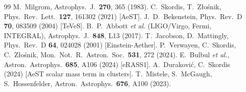 \documentclass[aps,prd,twocolumn,10pt,nofootinbib,superscriptaddress]{revtex4-2}
\begin{document}
\begin{thebibliography}{99}
 M.~Milgrom, Astrophys.\ J.\ \textbf{270}, 365 (1983).
 C.~Skordis, T.~Z\l o\'snik, Phys.\ Rev.\ Lett.\ \textbf{127}, 161302 (2021) [AeST].
 J.~D.~Bekenstein, Phys.\ Rev.\ D \textbf{70}, 083509 (2004) [TeVeS].
 B.~P.~Abbott \emph{et al.} (LIGO/Virgo, Fermi, INTEGRAL), Astrophys.\ J.\ \textbf{848}, L13 (2017).
 T.~Jacobson, D.~Mattingly, Phys.\ Rev.\ D \textbf{64}, 024028 (2001) [Einstein-Aether].
 P.~Verwayen, C.~Skordis, C.~Z\l o\'snik, Mon.\ Not.\ R.\ Astron.\ Soc.\ \textbf{531}, 272 (2024).
 E.~Bulbul \emph{et al.}, Astron.\ Astrophys.\ \textbf{685}, A106 (2024) [eRASS1].
 A.~Durakovi\'c, C.~Skordis (2024) [AeST scalar mass term in clusters].
 T.~Mistele, S.~McGaugh, S.~Hossenfelder, Astron.\ Astrophys.\ \textbf{676}, A100 (2023).
\end{thebibliography}
\end{document}
